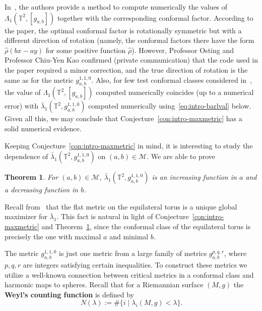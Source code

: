 \documentclass{amsart}
\theoremstyle{plain}
\newtheorem{theorem}{Theorem}
\theoremstyle{definition}
\theoremstyle{remark}
\begin{document}
In~\cite{KLO2017}, the authors provide a method to compute numerically the
values of \(\Lambda_1(\mathbb T^2,[g_{a,b}])\) together with the corresponding
conformal factor. According to the paper, the optimal conformal factor is
rotationally symmetric but with a different direction of rotation (namely, the
conformal factors there have the form \(\hat\rho(bx-ay)\) for some positive
function \(\hat\rho\)). However, Professor Osting and Professor Chiu-Yen Kao
confirmed (private communication) that the code used in the paper required a
minor correction, and the true direction of rotation is the same as for the
metric \(g_{a,b}^{1,1,0}\). Also, for few test conformal classes considered
in~\cite{KLO2017}, the value of \(\Lambda_1(\mathbb T^2,[g_{a,b}])\) computed
numerically coincides (up to a numerical error) with \(\bar\lambda_1(\mathbb
T^2,g_{a,b}^{1,1,0})\) computed numerically using~\eqref{eq:intro-barlval}
below. Given all this, we may conclude that Conjecture~\ref{con:intro-maxmetric}
has a solid numerical evidence.

Keeping Conjecture~\ref{con:intro-maxmetric} in mind, it is interesting to study
the dependence of \(\bar\lambda_1(\mathbb T^2,g_{a,b}^{1,1,0})\) on
\((a,b)\in\mathcal M\). We are able to prove

\begin{theorem}\label{th:intro-ab}
For \((a,b)\in\mathcal M\), \(\bar\lambda_1(\mathbb T^2,g_{a,b}^{1,1,0})\) is an
increasing function in \(a\) and a decreasing function in \(b\).
\end{theorem}

Recall from~\cite{Nad1996} that the flat metric on the equilateral torus is a
unique global maximizer for \(\bar\lambda_1\). This fact is natural in light of
Conjecture~\ref{con:intro-maxmetric} and Theorem~\ref{th:intro-ab}, since the
conformal class of the equilateral torus is precisely the one with maximal \(a\)
and minimal \(b\).

\smallskip

The metric \(g_{a,b}^{1,1,0}\) is just one metric from a large family of metrics
\(g_{a,b}^{p,q,r}\), where \(p,q,r\) are integers satisfying certain
inequalities. To construct these metrics we utilize a well-known connection
between critical metrics in a conformal class and harmonic maps to spheres.
Recall that for a Riemannian surface \((M,g)\) the \textbf{Weyl's counting
function} is defined by
\[
N(\lambda):=\#\{i\mid\lambda_i(M,g)<\lambda\}.
\]
\end{document}
